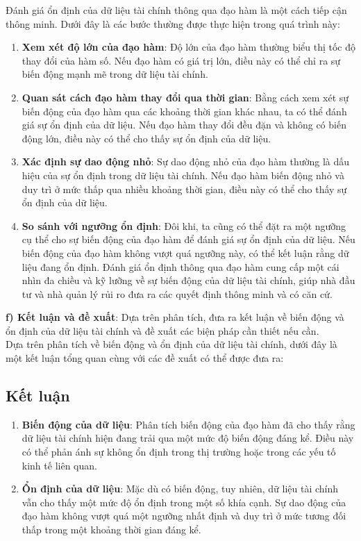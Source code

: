 \documentclass[12pt,a4paper]{report}
\begin{document}
Đánh giá ổn định của dữ liệu tài chính thông qua đạo hàm là một cách tiếp cận thông minh. Dưới đây là các bước thường được thực hiện trong quá trình này:
\begin{enumerate}
    \item \textbf{Xem xét độ lớn của đạo hàm}: Độ lớn của đạo hàm thường biểu thị tốc độ thay đổi của hàm số. Nếu đạo hàm có giá trị lớn, điều này có thể chỉ ra sự biến động mạnh mẽ trong dữ liệu tài chính.
    \item \textbf{Quan sát cách đạo hàm thay đổi qua thời gian}: Bằng cách xem xét sự biến động của đạo hàm qua các khoảng thời gian khác nhau, ta có thể đánh giá sự ổn định của dữ liệu. Nếu đạo hàm thay đổi đều đặn và không có biến động lớn, điều này có thể cho thấy sự ổn định của dữ liệu.
    \item \textbf{Xác định sự dao động nhỏ}: Sự dao động nhỏ của đạo hàm thường là dấu hiệu của sự ổn định trong dữ liệu tài chính. Nếu đạo hàm biến động nhỏ và duy trì ở mức thấp qua nhiều khoảng thời gian, điều này có thể cho thấy sự ổn định của dữ liệu.
    \item \textbf{So sánh với ngưỡng ổn định}: Đôi khi, ta cũng có thể đặt ra một ngưỡng cụ thể cho sự biến động của đạo hàm để đánh giá sự ổn định của dữ liệu. Nếu biến động của đạo hàm không vượt quá ngưỡng này, có thể kết luận rằng dữ liệu đang ổn định. Đánh giá ổn định thông qua đạo hàm cung cấp một cái nhìn đa chiều và kỹ lưỡng về sự biến động của dữ liệu tài chính, giúp nhà đầu tư và nhà quản lý rủi ro đưa ra các quyết định thông minh và có căn cứ.    
\end{enumerate}
\textbf{f) Kết luận và đề xuất}: Dựa trên phân tích, đưa ra kết luận về biến động và ổn định của dữ liệu tài chính và đề xuất các biện pháp cần thiết nếu cần.\\

Dựa trên phân tích về biến động và ổn định của dữ liệu tài chính, dưới đây là một kết luận tổng quan cùng với các đề xuất có thể được đưa ra:
\subsection*{Kết luận}
\begin{enumerate}
    \item \textbf{Biến động của dữ liệu}: Phân tích biến động của đạo hàm đã cho thấy rằng dữ liệu tài chính hiện đang trải qua một mức độ biến động đáng kể. Điều này có thể phản ánh sự không ổn định trong thị trường hoặc trong các yếu tố kinh tế liên quan.
    \item \textbf{Ổn định của dữ liệu}: Mặc dù có biến động, tuy nhiên, dữ liệu tài chính vẫn cho thấy một mức độ ổn định trong một số khía cạnh. Sự dao động của đạo hàm không vượt quá một ngưỡng nhất định và duy trì ở mức tương đối thấp trong một khoảng thời gian đáng kể.    
\end{enumerate}
\end{document}
